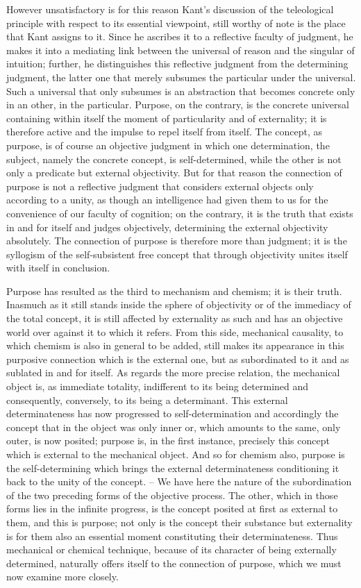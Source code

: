 However unsatisfactory is for this reason Kant's discussion
of the teleological principle with respect to its essential viewpoint,
still worthy of note is the place that Kant assigns to it.
Since he ascribes it to a reflective faculty of judgment,
he makes it into a mediating link between
the universal of reason and the singular of intuition;
further, he distinguishes this reflective judgment
from the determining judgment, the latter one that
merely subsumes the particular under the universal.
Such a universal that only subsumes is an abstraction
that becomes concrete only in an other, in the particular.
Purpose, on the contrary, is the concrete universal containing within itself
the moment of particularity and of externality;
it is therefore active and
the impulse to repel itself from itself.
The concept, as purpose, is of course
an objective judgment in which one determination,
the subject, namely the concrete concept, is self-determined,
while the other is not only a predicate but external objectivity.
But for that reason the connection of purpose is not
a reflective judgment that considers external objects
only according to a unity,
as though an intelligence had given them to us
for the convenience of our faculty of cognition;
on the contrary, it is the truth that exists in
and for itself and judges objectively,
determining the external objectivity absolutely.
The connection of purpose is therefore more than judgment;
it is the syllogism of the self-subsistent free concept
that through objectivity unites itself with itself in conclusion.

Purpose has resulted as the third to mechanism and chemism; it is their
truth.
Inasmuch as it still stands inside the sphere of objectivity or of the
immediacy of the total concept,
 it is still affected by externality as such and
has an objective world over against it to which it refers.
From this side,
mechanical causality,
to which chemism is also in general to be added,
still makes its appearance in this purposive connection which is the external
one,
but as subordinated to it and as sublated in and for itself. As regards
the more precise relation,
 the mechanical object is, as immediate totality,
indifferent to its being determined and consequently, conversely,
to its
being a determinant.
This external determinateness has now progressed to
self-determination and accordingly the concept that in the object was only
inner or, which amounts to the same, only outer, is now posited;
 purpose
is, in the first instance, precisely this concept which is external to the
mechanical object.
And so for chemism also, purpose is the self-determining
which brings the external determinateness conditioning it back to the unity
of the concept. –
We have here the nature of the subordination of the two
preceding forms of the objective process.
 The other, which in those forms
lies in the infinite progress, is the concept posited at first as external to them,
and this is purpose; not only is the concept their substance but externality
is for them also an essential moment constituting their determinateness.
Thus mechanical or chemical technique,
because of its character of being
externally determined,
naturally offers itself to the connection of purpose,
which we must now examine more closely.
